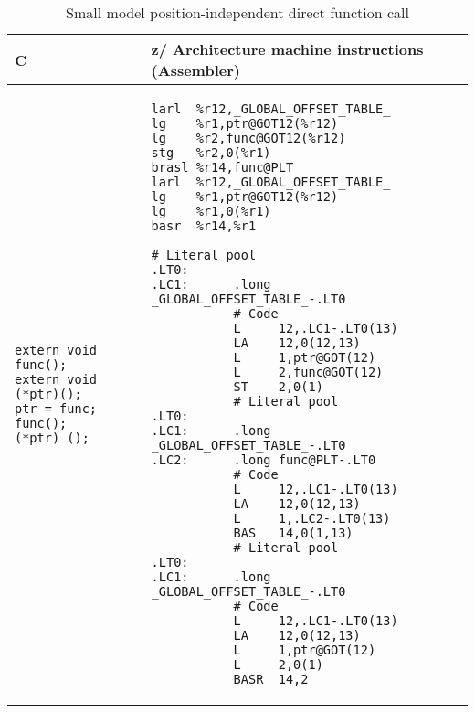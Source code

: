 \documentclass[english,11pt,twoside,toc=bib,toc=idx]{scrreprt}
\newcommand{\ARCH}{z/\kern-1pt Ar\-chi\-tec\-ture}
\newcommand{\ARCH}{ESA/390}
\newenvironment{DIFnomarkup}{}{} %
\begin{document}
\begin{table}
  \centering
  \begin{DIFnomarkup}
  \begin{tabular}{p{}p{}}
    \toprule
    C & \ARCH{} machine instructions (Assembler) \\
    \midrule
\begin{lstlisting}[style=short]
extern void func();
extern void (*ptr)();
ptr = func;
func();
(*ptr) ();
\end{lstlisting}
    &
\ifzseries
\begin{lstlisting}[style=short,language=simpleasm]
larl  %r12,_GLOBAL_OFFSET_TABLE_
lg    %r1,ptr@GOT12(%r12)
lg    %r2,func@GOT12(%r12)
stg   %r2,0(%r1)
brasl %r14,func@PLT
larl  %r12,_GLOBAL_OFFSET_TABLE_
lg    %r1,ptr@GOT12(%r12)
lg    %r1,0(%r1)
basr  %r14,%r1
\end{lstlisting}
\else
\begin{lstlisting}[style=short,language=simpleasm]
           # Literal pool
.LT0:
.LC1:      .long _GLOBAL_OFFSET_TABLE_-.LT0
           # Code
           L     12,.LC1-.LT0(13)
           LA    12,0(12,13)
           L     1,ptr@GOT(12)
           L     2,func@GOT(12)
           ST    2,0(1)
           # Literal pool
.LT0:
.LC1:      .long _GLOBAL_OFFSET_TABLE_-.LT0
.LC2:      .long func@PLT-.LT0
           # Code
           L     12,.LC1-.LT0(13)
           LA    12,0(12,13)
           L     1,.LC2-.LT0(13)
           BAS   14,0(1,13)
           # Literal pool
.LT0:
.LC1:      .long _GLOBAL_OFFSET_TABLE_-.LT0
           # Code
           L     12,.LC1-.LT0(13)
           LA    12,0(12,13)
           L     1,ptr@GOT(12)
           L     2,0(1)
           BASR  14,2
\end{lstlisting}
\fi \\
    \bottomrule
  \end{tabular}
  \end{DIFnomarkup}
  \caption{Small model position-independent {\ifzseries\else direct\fi}
    function call}
  \label{tab:fnsmalldirect}
\end{table}
\end{document}

